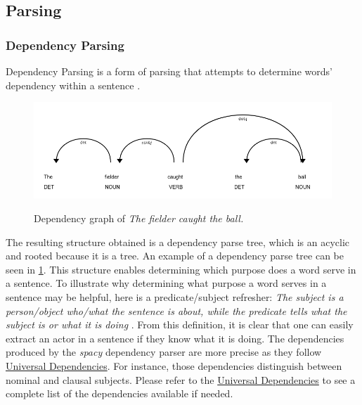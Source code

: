 \subsection{Parsing}

\subsubsection{Dependency Parsing}
\label{dependency-parsing}

Dependency Parsing is a form of parsing that attempts to determine words' dependency within a sentence \cite{RefWorks:RefID:28-jurafsky2014speech}.

\begin{figure}[h]
\caption{Dependency graph of \emph{The fielder caught the ball.}}
\centering
\includegraphics[width=\textwidth]{background/dependency_graph.png}
\label{dependency-graph}
\end{figure}

The resulting structure obtained is a dependency parse tree, which is an acyclic and rooted because it is a tree.
An example of a dependency parse tree can be seen in \ref{dependency-graph}.
This structure enables determining which purpose does a word serve in a sentence.
To illustrate why determining what purpose a word serves in a sentence may be helpful, here is a predicate/subject refresher:
\emph{The subject is a person/object who/what the sentence is about, while the predicate tells what the subject is or what it is doing} \cite{RefWorks:RefID:27-subject}.
From this definition, it is clear that one can easily extract an actor in a sentence if they know what it is doing.
The dependencies produced by the \emph{spacy} dependency parser are more precise as they follow \hyperlink{https://univesaldependencies.org}{Universal Dependencies}.
For instance, those dependencies distinguish between nominal and clausal subjects.
Please refer to the \hyperlink{https://univesaldependencies.org}{Universal Dependencies} to see a complete list of the dependencies available if needed. 


